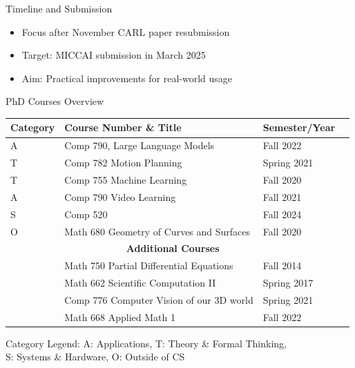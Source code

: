 \documentclass{beamer}
\begin{document}
\begin{frame}{Timeline and Submission}
	\begin{itemize}
		\item Focus after November CARL paper resubmission
		\item Target: MICCAI submission in March 2025
		\item Aim: Practical improvements for real-world usage
	\end{itemize}
\end{frame}



\begin{frame}{PhD Courses Overview}
    \begin{table}
        \scriptsize
        \begin{tabular}{llll}
            \textbf{Category} & \textbf{Course Number \& Title} & \textbf{Semester/Year} \\
            \hline
            A & Comp 790, Large Language Models & Fall 2022 \\
            T & Comp 782 Motion Planning & Spring 2021 \\
            T & Comp 755 Machine Learning & Fall 2020 \\
            A & Comp 790 Video Learning & Fall 2021 \\
            S & Comp 520 & Fall 2024 \\
            O & Math 680 Geometry of Curves and Surfaces & Fall 2020 \\
            \hline
            \multicolumn{3}{c}{\textbf{Additional Courses}} \\
            \hline
             & Math 750 Partial Differential Equations & Fall 2014 \\
             & Math 662 Scientific Computation II & Spring 2017 \\
             & Comp 776 Computer Vision of our 3D world & Spring 2021 \\
             & Math 668 Applied Math 1 & Fall 2022 \\
        \end{tabular}
    \end{table}

    \vspace{0.2cm}
    \tiny{
    Category Legend: A: Applications, T: Theory \& Formal Thinking,\\
    S: Systems \& Hardware, O: Outside of CS
    }
\end{frame}
\end{document}
